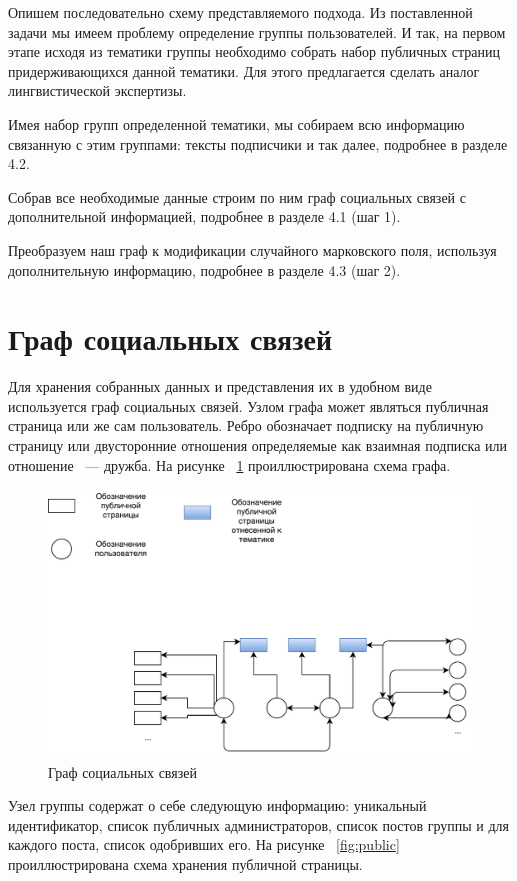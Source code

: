 \documentclass[annotation,times,page4]{itmo-student-thesis}
\begin{document}
Опишем последовательно схему представляемого подхода. Из поставленной задачи мы имеем проблему определение группы пользователей. И так, на первом этапе исходя из тематики группы необходимо собрать набор публичных страниц придерживающихся данной тематики. Для этого предлагается сделать аналог лингвистической экспертизы. 

Имея набор групп определенной тематики, мы собираем всю информацию связанную с этим группами: тексты подписчики и так далее, подробнее в разделе 4.2.

Собрав все необходимые данные строим по ним граф социальных связей с дополнительной информацией, подробнее в разделе 4.1 (шаг 1).

Преобразуем наш граф к модификации случайного марковского поля, используя дополнительную информацию, подробнее в разделе 4.3 (шаг 2).

\section{Граф социальных связей}
Для хранения собранных данных и представления их в удобном виде используется граф социальных связей.
Узлом графа может являться публичная страница или же сам пользователь. Ребро обозначает подписку на публичную страницу или двусторонние отношения определяемые как взаимная подписка или отношение ~--- дружба. На рисунке ~\ref{fig:grapth} проиллюстрирована схема графа.

\begin{figure}[!h]
\caption{Граф социальных связей}
\label{fig:grapth}
\centering
\includegraphics[width=\textwidth]{figs/graph.pdf}
\end{figure}

Узел группы содержат о себе следующую информацию: уникальный идентификатор, список публичных администраторов, список постов группы и для каждого поста, список одобривших его. На рисунке ~\ref{fig:public} проиллюстрирована схема хранения публичной страницы.
\end{document}
